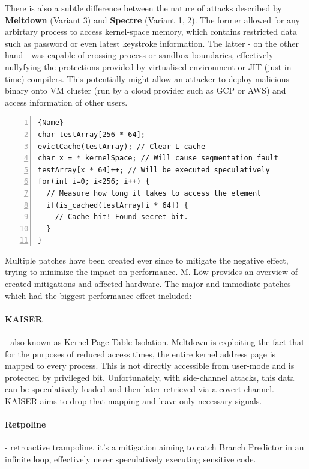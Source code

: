 \documentclass{csfourzero}
\begin{document}
There is also a subtle difference between the nature of attacks described by \textbf{Meltdown} (Variant 3) and \textbf{Spectre} (Variant 1, 2). The former allowed for any arbirtary process to access kernel-space memory, which contains restricted data such as password or even latest keystroke information. The latter - on the other hand - was capable of crossing process or sandbox boundaries, effectively nullyfying the protections provided by virtualised environment or JIT (just-in-time) compilers. This potentially might allow an attacker to deploy malicious binary onto VM cluster (run by a cloud provider such as GCP or AWS) and access information of other users.

\begin{lstlisting}[caption=Meltdown PoC,frame=tlrb, numbers=left, firstnumber=1]{Name}
char testArray[256 * 64];
evictCache(testArray); // Clear L-cache
char x = * kernelSpace; // Will cause segmentation fault
testArray[x * 64]++; // Will be executed speculatively
for(int i=0; i<256; i++) {
  // Measure how long it takes to access the element
  if(is_cached(testArray[i * 64]) {
    // Cache hit! Found secret bit.
  }
}
\end{lstlisting}

Multiple patches have been created ever since to mitigate the negative effect, trying to minimize the impact on performance. M. L{\"o}w\cite{low2018overview} provides an overview of created mitigations and affected hardware. The major and immediate patches which had the biggest performance effect included:

\paragraph{KAISER} \cite{corbet2017current} - also known as Kernel Page-Table Isolation. Meltdown is exploiting the fact that for the purposes of reduced access times, the entire kernel address page is mapped to every process. This is not directly accessible from user-mode and is protected by privileged bit. Unfortunately, with side-channel attacks, this data can be speculatively loaded and then later retrieved via a covert channel. KAISER aims to drop that mapping and leave only necessary signals.
\paragraph{Retpoline} \cite{turner2018retpoline} - retroactive trampoline, it's a mitigation aiming to catch Branch Predictor in an infinite loop, effectively never speculatively executing sensitive code.
\end{document}

